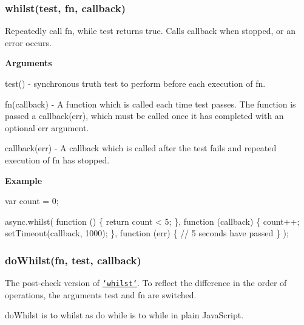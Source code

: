 \label{_whilst}%
 \subsubsection*{whilst(test, fn, callback)}

Repeatedly call {\ttfamily fn}, while {\ttfamily test} returns {\ttfamily true}. Calls {\ttfamily callback} when stopped, or an error occurs.

{\bfseries Arguments}


\begin{DoxyItemize}
\item {\ttfamily test()} -\/ synchronous truth test to perform before each execution of {\ttfamily fn}.
\item {\ttfamily fn(callback)} -\/ A function which is called each time {\ttfamily test} passes. The function is passed a {\ttfamily callback(err)}, which must be called once it has completed with an optional {\ttfamily err} argument.
\item {\ttfamily callback(err)} -\/ A callback which is called after the test fails and repeated execution of {\ttfamily fn} has stopped.
\end{DoxyItemize}

{\bfseries Example}


\begin{DoxyCode}
var count = 0;

async.whilst(
    \textcolor{keyword}{function} () \{ \textcolor{keywordflow}{return} count < 5; \},
    \textcolor{keyword}{function} (callback) \{
        count++;
        setTimeout(callback, 1000);
    \},
    \textcolor{keyword}{function} (err) \{
        \textcolor{comment}{// 5 seconds have passed}
    \}
);
\end{DoxyCode}
 



\label{_doWhilst}%
 \subsubsection*{do\+Whilst(fn, test, callback)}

The post-\/check version of \href{#whilst}{\tt `whilst`}. To reflect the difference in the order of operations, the arguments {\ttfamily test} and {\ttfamily fn} are switched.

{\ttfamily do\+Whilst} is to {\ttfamily whilst} as {\ttfamily do while} is to {\ttfamily while} in plain Java\+Script. 



\label{_until}%
